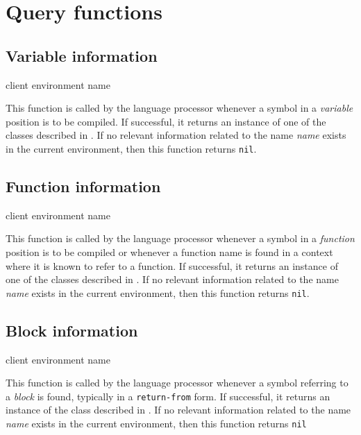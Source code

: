 \section{Query functions}
\label{sec-querying-query-functions}

\subsection{Variable information}

{\footnotesize
{} {client environment name}
}

This function is called by the language processor whenever a symbol in
a \emph{variable} position is to be compiled.  If successful, it
returns an instance of one of the classes described in
.  If no
relevant information related to the name \textit{name} exists in the
current environment, then this function returns \texttt{nil}.

\subsection{Function information}

{\footnotesize
{} {client environment name}
}

This function is called by the language processor whenever a symbol in
a \emph{function} position is to be compiled or whenever a function
name is found in a context where it is known to refer to a function.
If successful, it returns an instance of one of the classes described
in .  If no
relevant information related to the name \textit{name} exists in the
current environment, then this function returns \texttt{nil}.

\subsection{Block information}

{\footnotesize
{} {client environment name}
}

This function is called by the language processor whenever a symbol
referring to a \emph{block} is found, typically in a
\texttt{return-from} form.  If successful, it returns an instance of
the class described in
.  If no relevant
information related to the name \textit{name} exists in the current
environment, then this function returns \texttt{nil}

